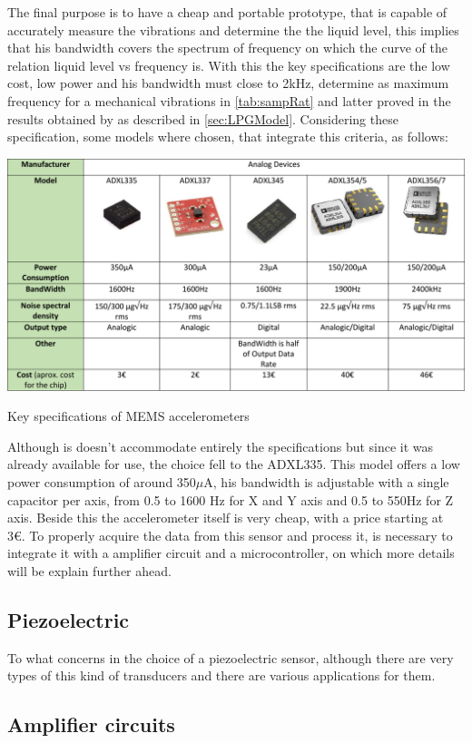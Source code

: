 The final purpose is to have a cheap and portable prototype, that is capable of accurately measure the vibrations and determine the the liquid level, this implies that his bandwidth covers the spectrum of frequency on which the curve of the relation liquid level vs frequency is. With this the key specifications are the low cost, low power and his bandwidth must close to 2kHz, determine as maximum frequency for a mechanical vibrations in \ref{tab:sampRat} and latter proved in the results obtained by \citeauthor{wuLiquidLevelDetector2014b} as described in \ref{sec:LPGModel}. Considering these specification, some models where chosen, that integrate this criteria, as follows:
\begin{table}
    \centering
    \includegraphics[width=1\textwidth]{Chapters/3CHP/Images/accTable.pdf}
    \caption{Key specifications of MEMS accelerometers}
    \label{fig:acctable}
\end{table}
Although is doesn't accommodate entirely the specifications but since it was already available for use, the choice fell to the ADXL335. This model offers a low power consumption of around 350$\mu$A, his bandwidth is adjustable with a single capacitor per axis, from 0.5 to 1600 Hz for X and Y axis and 0.5 to 550Hz for Z axis. Beside this the accelerometer itself is very cheap, with a price starting at 3€. To properly acquire the data from this sensor and process it, is necessary to integrate it with a amplifier circuit and a microcontroller, on which more details will be explain further ahead.
\subsection{Piezoelectric}
To what concerns in the choice of a piezoelectric sensor, although there are very types of this kind of transducers and there are various applications for them.  
\subsection{Amplifier circuits}
